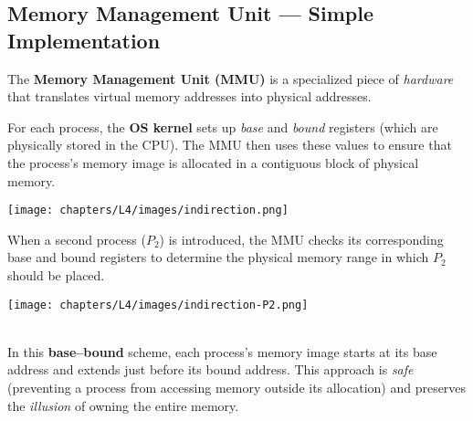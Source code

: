 \documentclass[../../compsys.tex]{subfiles}
\begin{document}
\subsection{Memory Management Unit --- Simple Implementation}
\vspace{10px}
\noindent The \textbf{Memory Management Unit (MMU)} is a specialized piece of \textit{hardware} that translates virtual memory addresses into physical addresses.\\[10px]
\vspace{10px}
\noindent
\begin{minipage}{0.45\textwidth}
  For each process, the \textbf{OS kernel} sets up \emph{base} and \emph{bound} registers (which are physically stored in the CPU). The MMU then uses these values to ensure that the process’s memory image is allocated in a contiguous block of physical memory.\\[10px]
\begin{center}
  \texttt{[image: chapters/L4/images/indirection.png]}
\end{center}
\end{minipage}%
\hfill
\vline
\hfill
\begin{minipage}{0.45\textwidth}
\noindent When a second process (\(P_2\)) is introduced, the MMU checks its corresponding base and bound registers to determine the physical memory range in which \(P_2\) should be placed.
\begin{center}
  \texttt{[image: chapters/L4/images/indirection-P2.png]}
\end{center}
\end{minipage}
\\[70px]

\noindent In this \textbf{base--bound} scheme, each process’s memory image starts at its base address and extends just before its bound address. This approach is \textit{safe} (preventing a process from accessing memory outside its allocation) and preserves the \textit{illusion} of owning the entire memory. \\[3px]
\end{document}

